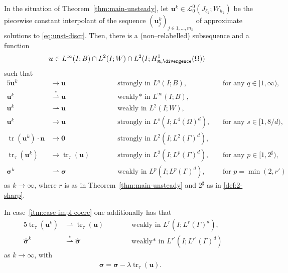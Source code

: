 \documentclass[reqno,a4paper]{amsart}
\def\vec#1{\boldsymbol{#1}}
\def\tr{\mathop{\mathrm{tr}}\nolimits}
\def\wconv{\rightharpoonup}
\def\wsconv{\overset{*}{\rightharpoonup}}
\def\b0{\vec{0}}
\def\bn{\vec{n}}
\def\bu{\vec{u}}
\def\bsigma{\vec{\sigma}}
\begin{document}
\begin{lemma}\label{lem:unst-conv-u}
	In the situation of Theorem~\ref{thm:main-unsteady}, let $ \bu^k \in \mathcal{L}^0_0(J_{\delta_k};W_{h_k})$ be the piecewise constant interpolant of the sequence $( \bu^k_j)_{j \in {1, \ldots, m_k}}$ of approximate solutions to \eqref{eq:unst-discr}. 
	Then, there is a (non--relabelled) subsequence and a function
	\begin{align*}
		\bu & \in L^\infty(I;B) \cap L^{2}(I;W) \cap L^2(I;H^1_{\bn,\divergence}(\Omega)) %
	\end{align*}
	such that 
	\begin{alignat*}{5}
		\bu^k 
		&\to  \bu \quad 
		&&\text{ strongly in } L^q(I;B), &&\text{ for any } q \in [1,\infty),
		\\
		\bu^k 
		&\overset{*}{\rightharpoonup}  \bu \quad 
		&&\text{ weakly* in } L^\infty(I;B),
		\\
		\bu^k 
		&\rightharpoonup  \bu \quad 
		&&\text{ weakly in } L^2(I;W),
		\\
		\bu^k &\to \bu \quad &&\text{ strongly in } L^s(I;L^4(\Omega)^d), 
		\quad &&\text{ for any } s \in [1,8/d),\\
		\tr (\bu^k) \cdot \bn &\to \b0 \qquad &&\text{ strongly in } L^2(I;L^2(\Gamma)^d), \quad &&
		\\
		\tr_\tau (\bu^k)
		&\to \tr_\tau(\bu) \qquad
		&& \text{ strongly in } L^2(I;L^p(\Gamma)^d),  \quad
		&&  \text{ for any } 
	   p \in [1, 2^\sharp),\\
		\bsigma^k
		& 
		\wconv \bsigma \qquad
		&& 
		\text{ weakly in } L^{p}(I;L^{p}(\Gamma)^d), &&\text{ for } p = \min(2,r')
	\end{alignat*}	
	as $k \to \infty$, {where $r$ is as in Theorem~\ref{thm:main-unsteady}} and $2^\sharp$ as in \eqref{def:2-sharp}.
	
	In case~\ref{itm:case-impl-coerc} one additionally has that 
	\begin{alignat*}{5}
		\tr_\tau (\bu^k) &\wconv \tr_\tau(\bu) \qquad &&\text{ weakly in } L^r(I;L^r(\Gamma)^d),
		\quad
		&& \\
		\widehat{\bsigma}^k &\wsconv \widehat{\bsigma} \qquad &&\text{ weakly* in } L^{r'}(I;L^{r'}(\Gamma)^d)&& 
	\end{alignat*}	
	as $k \to \infty$, 
	with 
	\begin{align}\label{id:sigma}
		\bsigma = \widehat{\bsigma} - \lambda \tr_{\tau}(\bu). 
	\end{align}
\end{lemma}
\end{document}
